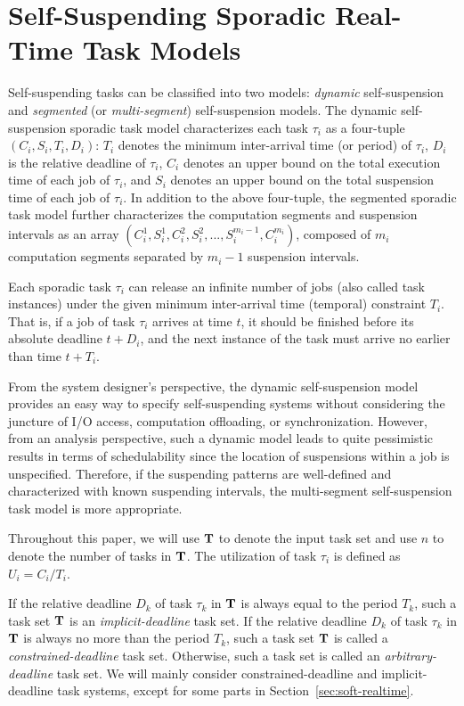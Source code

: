 \section{Self-Suspending Sporadic Real-Time Task Models}
\label{sec:model}
  
Self-suspending tasks can be classified into two models: \emph{dynamic} self-suspension and \emph{segmented} (or \emph{multi-segment}) self-suspension models. 
The dynamic self-suspension sporadic task model characterizes each
task $\tau_i$ as a four-tuple $(C_i,S_i,T_i,D_i)$: $T_i$ denotes the minimum inter-arrival time (or period) of $\tau_i$, $D_i$ is the relative deadline of $\tau_i$,
$C_i$ denotes an upper bound on the total execution time of each job of $\tau_i$,
and $S_i$ denotes an upper bound on the total suspension time of each job of $\tau_i$.  In addition to the above four-tuple, the segmented sporadic task model further 
characterizes the computation segments and suspension intervals as an array
$(C_{i}^1,S_{i}^1,C_{i}^2,S_{i}^2,...,S_{i}^{m_i-1},C_{i}^{m_i})$, composed of $m_i$ computation segments separated by $m_i-1$ suspension intervals. 

Each sporadic task $\tau_i$ can release an infinite number of jobs
(also called task instances) under the given minimum inter-arrival
time (temporal) constraint $T_i$.  That is, if a
job of task $\tau_i$ arrives at time $t$, it should be finished before
its absolute deadline $t+D_i$, and  the next instance of
the task must arrive no earlier than time $t + T_i$.

From the system designer's perspective, the dynamic self-suspension model provides an easy way to specify self-suspending systems without considering the juncture of I/O access, computation offloading, or synchronization. 
However, from an analysis perspective, such a  dynamic model leads to quite pessimistic results in terms of schedulability since the location of suspensions within a job is unspecified. Therefore, if the suspending patterns are well-defined and characterized with known suspending intervals, the multi-segment self-suspension task model is more appropriate.   


Throughout this paper, we will use ${\bf T}$ to denote the input task
set and use $n$ to denote the number of tasks in ${\bf T}$. The
utilization of task $\tau_i$ is defined as $U_i=C_i/T_i$.

If the relative deadline $D_k$ of task $\tau_k$ in ${\bf T}$ is always
equal to the period $T_k$, such a task set ${\bf T}$ is an
\emph{implicit-deadline} task set. If the relative deadline $D_k$ of
task $\tau_k$ in ${\bf T}$ is always no more than the period $T_k$,
such a task set ${\bf T}$ is called a \emph{constrained-deadline} task
set. Otherwise, such a task set is called an \emph{arbitrary-deadline}
task set. We will mainly consider constrained-deadline and
implicit-deadline task systems, except for some parts in
Section~\ref{sec:soft-realtime}.

